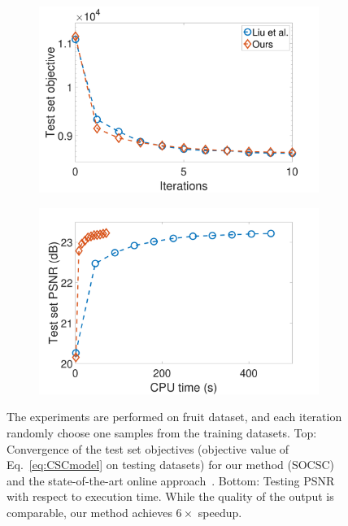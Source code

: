 \begin{figure}[h]
\centering
\begin{subfigure}{0.49\textwidth}
  \includegraphics[width=1\linewidth]{figure/onlineVSliu-ite-fruit.pdf}
\end{subfigure}
\begin{subfigure}{0.49\textwidth}
  \includegraphics[width=1\linewidth]{figure/onlineVSliu-time-fruit.pdf}
\end{subfigure}

\caption{The experiments are performed on fruit dataset, and each iteration randomly choose one samples from the training datasets. Top: Convergence of the test set objectives (objective value of Eq.~\ref{eq:CSCmodel} on testing datasets) for our method (SOCSC) and the state-of-the-art online approach~\cite{liu-2018-first}. Bottom: Testing PSNR with respect to execution time. While the quality of the output is comparable, our method achieves $6 \times$ speedup.}
\label{fig:onlineSmall}
\end{figure}

